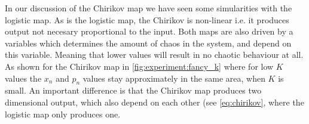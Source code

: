 
In our discussion of the Chirikov map we have seen some simularities with the logistic map. As is the logistic map, the Chirikov is non-linear i.e. it produces output not necesary proportional to the input. Both maps are also driven by a variables which determines the amount of chaos in the system, and depend on this variable. Meaning that lower values will result in no chaotic behaviour at all. As shown for the Chirikov map in \cref{fig:experiment:fancy_k} where for low $K$ values the $x_n$ and $p_n$ values stay approximately in the same area, when $K$ is small. An important difference is that the Chirikov map produces two dimensional output, which also depend on each other (see \eqref{eq:chirikov}, where the logistic map only produces one. 